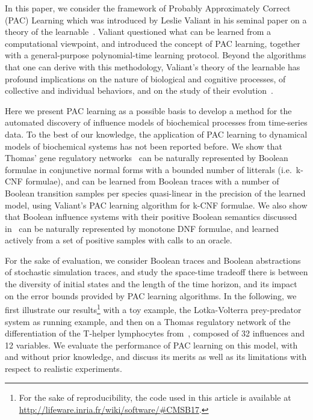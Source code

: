 \documentclass{llncs}
\begin{document}
In this paper, we consider the framework of Probably Approximately Correct (PAC) Learning 
which was introduced by Leslie Valiant in his seminal paper on a theory of the learnable~\cite{Valiant84cacm}.
Valiant questioned what can be learned from a computational viewpoint,
and introduced the concept of PAC learning,
together with a general-purpose polynomial-time learning protocol.
Beyond the algorithms that one can derive with this methodology,
Valiant's theory of the learnable has profound implications
on the nature of biological and cognitive processes,
of collective and individual behaviors,
and on the study of their evolution~\cite{Valiant13book}.

Here we present PAC learning as a possible basis to develop a method for the automated discovery of influence models of biochemical processes from time-series data. 
To the best of our knowledge, 
the application of PAC learning to dynamical models of biochemical systems has not been reported before.
We show that Thomas' gene regulatory networks~\cite{Thomas91jtb,Thomas73jtb} can be naturally represented by 
Boolean formulae in conjunctive normal forms with a bounded number of litterals (i.e.~k-CNF formulae),
and can be learned from Boolean traces with a number of Boolean transition samples per species quasi-linear in the precision of the learned model, using Valiant's PAC learning algorithm for k-CNF formulae.
We also show that Boolean influence systems with their positive Boolean semantics discussed in~\cite{FMRS16cmsb}
can be naturally represented by monotone DNF formulae,
and learned actively from a set of positive samples with calls to an oracle.

For the sake of evaluation, we consider Boolean traces and Boolean abstractions of stochastic simulation traces,
and study the space-time tradeoff there is between the diversity of initial states and the length of the time horizon, 
and its impact on the error bounds provided by PAC learning algorithms.
In the following, we first illustrate our results\footnote{For the sake of reproducibility, the code used in this article is available at \url{http://lifeware.inria.fr/wiki/software/\#CMSB17}.} with a toy example, the Lotka-Volterra prey-predator system as running example,
and then on a Thomas regulatory network of 
the differentiation of the T-helper lymphocytes from~\cite{RRMTC06tcsb,Mendoza06biosystems},
composed of 32 influences and 12 variables.
We evaluate the performance of PAC learning on this model, with and without prior knowledge,
and discuss its merits as well as its limitations with respect to realistic experiments.
\end{document}
